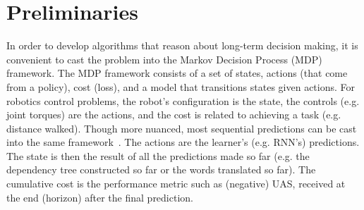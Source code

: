 \documentclass{article}
\newcommand{\BB}[1]{\textcolor{red}{\bf Byron: {#1}}}
\newcommand{\drew}[1]{\textcolor{blue}{\bf Drew: {#1}}}
\begin{document}

\section{Preliminaries}
In order to develop algorithms that reason about long-term decision making, it is convenient to cast the problem into the Markov Decision Process (MDP) framework. The MDP framework consists of a set of states, actions (that come from a policy), cost (loss), and a model that transitions states given actions. For robotics control problems, the robot's configuration is the state, the controls (e.g. joint torques) are the actions, and the cost is related to achieving a task (e.g. distance walked). Though more nuanced, most sequential predictions can be cast into the same framework~\cite{daume2009search}. The actions are the learner's (e.g. RNN's) predictions. The state is then the result of all the predictions made so far (e.g. the dependency tree constructed so far or the words translated so far). The cumulative cost is the performance metric such as (negative) UAS, received at the end (horizon) after the final prediction.
\end{document}
